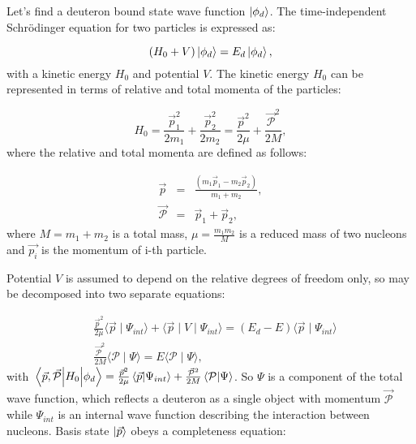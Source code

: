     Let's find a deuteron bound state wave function $\ket{\phi_d}$. 
    The time-independent Schr\"{o}dinger equation for two particles is expressed as:

    \begin{equation}
        (H_0 + V) \ket{\phi_d}  = E_d \ket{\phi_d},
        \label{shrod_bound}
    \end{equation}
    with a kinetic energy $H_0$ and potential $V$. 
    The kinetic energy $H_0$ can be represented in terms of  relative and total momenta
    of the particles:

    \begin{equation}
        H_0 = \frac{\vec{p}_1^2}{2m_1} + \frac{\vec{p}_2^2}{2m_2} = 
        \frac{\vec{p}^2}{2\mu} + \frac{\vec{\mathcal{P}}^2}{2M}, 
    \end{equation}
    where the relative and total momenta are defined as follows:

    \begin{eqnarray}
        \vec{p} &=& \frac{(m_1\vec{p}_1 - m_2\vec{p}_2)}{m_1 + m_2},\\
        \vec{\mathcal{P}} &=& \vec{p}_1 + \vec{p}_2,
    \end{eqnarray}
    where $M = m_1 + m_2$ is a total mass, $\mu = \frac{m_1m_2}{M}$ is a reduced mass of two nucleons and 
    $\vec{p_i}$ is the momentum of i-th particle.

    Potential $V$ is assumed to depend on the relative degrees of freedom only, so
     may be decomposed into two separate equations:

    \begin{eqnarray}
        &\frac{\vec{p}^2}{2\mu} \langle \vec{p} \mid \Psi_{int} \rangle +
        \langle \vec{p} \mid V \mid \Psi_{int} \rangle = 
        (E_d - E)\langle \vec{p} \mid \Psi_{int} \rangle \label{se1}\\
        &\frac{\vec{\mathcal{P}}^2}{2M} \langle \mathcal{P} \mid \Psi \rangle = 
        E\langle \mathcal{P} \mid \Psi \rangle \label{se2},
    \end{eqnarray}
    with $\matrixel{\vec{p},\vec{\mathcal{P}}}{H_0}{\phi_d} = \frac{\vec{p}^2}{2\mu} \braket{\vec{p}}{\Psi_{int}} +
    \frac{\vec{\mathcal{P}}^2}{2M} \braket {\mathcal{P}} {\Psi} $. So $\Psi$ is a component 
    of the total wave function, which reflects a deuteron as a single object with momentum $\vec{\mathcal{P}}$
    while $\Psi_{int}$ is an internal wave function describing the interaction between nucleons.
    Basis state $\ket{\vec{p}}$  obeys a completeness
    equation:

